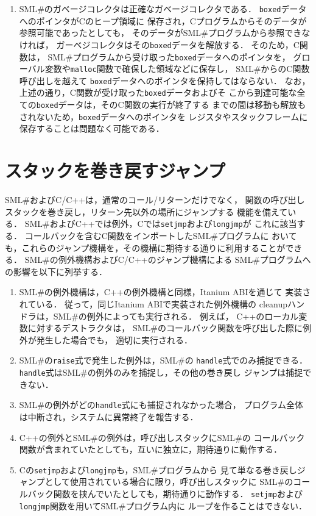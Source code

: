 \documentclass{jbook}
\newcommand{\smlsharp}{SML\#}
\begin{document}
\begin{enumerate}
	\smlsharp{}コンパイラは，
トップレベルで定義された関数のみをコールバック関数として使用する
場合，メモリリークが起こらないことを保証する．
\item
	\smlsharp{}のガベージコレクタは正確なガベージコレクタである．
	{\tt boxed}データへのポインタがCのヒープ領域に
保存され，Cプログラムからそのデータが参照可能であったとしても，
そのデータが\smlsharp{}プログラムから参照できなければ，
ガーベジコレクタはその{\tt boxed}データを解放する．
	そのため，C関数は，
\smlsharp{}プログラムから受け取った{\tt boxed}データへのポインタを，
グローバル変数や{\tt malloc}関数で確保した領域などに保存し，
\smlsharp{}からのC関数呼び出しを越えて
{\tt boxed}データへのポインタを保持してはならない．
	なお，上述の通り，C関数が受け取った{\tt boxed}データおよびそ
こから到達可能な全ての{\tt boxed}データは，そのC関数の実行が終了する
までの間は移動も解放もされないため，{\tt boxed}データへのポインタを
レジスタやスタックフレームに保存することは問題なく可能である．
\end{enumerate}

\section{スタックを巻き戻すジャンプ}

	\smlsharp{}およびC/C++は，通常のコール/リターンだけでなく，
関数の呼び出しスタックを巻き戻し，リターン先以外の場所にジャンプする
機能を備えている．
	\smlsharp{}およびC++では例外，Cでは{\tt setjmp}および{\tt longjmp}が
これに該当する．
	コールバックを含むC関数をインポートした\smlsharp{}プログラムに
おいても，これらのジャンプ機構を，その機構に期待する通りに利用することができる．
	\smlsharp{}の例外機構およびC/C++のジャンプ機構による
\smlsharp{}プログラムへの影響を以下に列挙する．
\begin{enumerate}
\item
	\smlsharp{}の例外機構は，C++の例外機構と同様，Itanium ABIを通じて
実装されている．
	従って，同じItanium ABIで実装された例外機構の
cleanupハンドラは，\smlsharp{}の例外によっても実行される．
	例えば，
C++のローカル変数に対するデストラクタは，
\smlsharp{}のコールバック関数を呼び出した際に例外が発生した場合でも，
適切に実行される．
\item
	\smlsharp{}の{\tt raise}式で発生した例外は，\smlsharp{}の
{\tt handle}式でのみ捕捉できる．
	{\tt handle}式は\smlsharp{}の例外のみを捕捉し，その他の巻き戻し
ジャンプは捕捉できない．
\item
	\smlsharp{}の例外がどの{\tt handle}式にも捕捉されなかった場合，
プログラム全体は中断され，システムに異常終了を報告する．
\item
	C++の例外と\smlsharp{}の例外は，呼び出しスタックに\smlsharp{}の
コールバック関数が含まれていたとしても，互いに独立に，期待通りに動作する．
\item
	Cの{\tt setjmp}および{\tt longjmp}も，\smlsharp{}プログラムから
見て単なる巻き戻しジャンプとして使用されている場合に限り，呼び出しスタックに
\smlsharp{}のコールバック関数を挟んでいたとしても，期待通りに動作する．
	{\tt setjmp}および{\tt longjmp}関数を用いて\smlsharp{}プログラム内に
ループを作ることはできない．
\end{enumerate}
\end{document}

